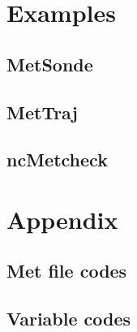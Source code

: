 \documentclass[11pt]{article}   %
\begin{document}
%
%
%
%
%
%
%
%
%
%
%

\clearpage
\section{Examples}
\subsection{MetSonde}
\subsection{MetTraj}
\subsection{ncMetcheck}

\clearpage

\section{Appendix}
\subsection{Met file codes}
\subsection{Variable codes}
\end{document}
